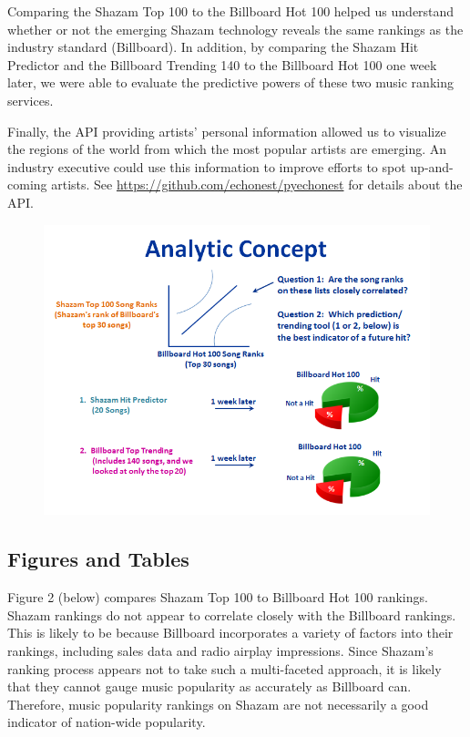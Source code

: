 \documentclass{article}
\begin{document}
\noindent
Comparing the Shazam Top 100 to the Billboard Hot 100 helped us understand whether or not the emerging Shazam technology reveals the same rankings as the industry standard (Billboard). In addition, by comparing the Shazam Hit Predictor and the Billboard Trending 140 to the Billboard Hot 100 one week later, we were able to evaluate the predictive powers of these two music ranking services. \vspace{2mm}


\noindent
Finally, the API providing artists' personal information allowed us to visualize the regions of the world from which the most popular artists are emerging. An industry executive could use this information to improve efforts to spot up-and-coming artists. See \url{https://github.com/echonest/pyechonest} for details about the API.

\vspace{25mm}
\begin{figure}[hp]
  \centering
    \includegraphics[scale=0.8]{Analytic_Concept}
\end{figure}

\subsection{Figures and Tables}

Figure 2 (below) compares Shazam Top 100 to Billboard Hot 100 rankings. Shazam rankings do not appear to correlate closely with the Billboard rankings. This is likely to be because Billboard incorporates a variety of factors into their rankings, including sales data and radio airplay impressions. Since Shazam's ranking process appears not to take such a multi-faceted approach, it is likely that they cannot gauge music popularity as accurately as Billboard can. Therefore, music popularity rankings on Shazam are not necessarily a good indicator of nation-wide popularity.\vspace{2mm}  
\end{document}
